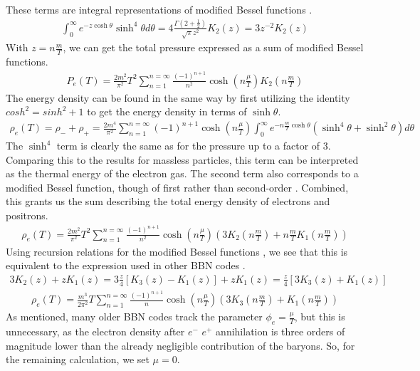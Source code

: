 These terms are integral representations of modified Bessel functions \cite[\href{https://dlmf.nist.gov/10.32.E8}{(10.32.8)}]{NIST:DLMF}.
\begin{align}
    \int_{0}^{\infty}e^{-z\cosh\theta}\sinh^4 \theta d\theta=4\frac{\Gamma(2+\frac{1}{2})}{\sqrt{\pi}z^2}K_2\left(z\right)=3z^{-2}K_2\left(z\right)
\end{align}
With $z=n\frac{m }{T}$, we can get the total pressure expressed as a sum of modified Bessel functions.
\begin{align}
    P_e(T)=\frac{2m^2}{\pi^2} T^2 \sum_{n=1}^{n=\infty} \frac{(-1)^{n+1}}{n^{2}} \cosh{\left(n\frac{\mu}{T}\right)}   K_2\left(n\frac{m }{T}\right)
    \label{eq:Pelectron}
\end{align}
The energy density can be found in the same way by first utilizing the identity $cosh^2=sinh^2+1$ to get the energy density in terms of $\sinh\theta$.
\begin{align}
    \rho_e(T)=\rho_-+\rho_+=\frac{2m^4}{\pi^2}\sum_{n=1}^{n=\infty} (-1)^{n+1} \cosh{\left(n\frac{\mu}{T}\right)}  \int_{0}^{\infty}e^{-n\frac{m }{T}\cosh\theta}\left(\sinh^4\theta +\sinh^2\theta\right) d\theta
\end{align}
The $\sinh^4$ term is clearly the same as for the pressure up to a factor of 3. Comparing this to the results for massless particles, this term can be interpreted as the thermal energy of the electron gas. The second term also corresponds to a modified Bessel function, though of first rather than second-order \cite[\href{https://dlmf.nist.gov/10.32.E8}{(10.32.8)}]{NIST:DLMF}. Combined, this grants us the sum describing the total energy density of electrons and positrons.
\begin{align}
    \rho_e(T)=\frac{2m^2}{\pi^2} T^2 \sum_{n=1}^{n=\infty} \frac{(-1)^{n+1}}{n^{2}} \cosh{\left(n\frac{\mu}{T}\right)}  \left( 3 K_2\left(n\frac{m }{T}\right) + n\frac{m }{T} K_1\left(n\frac{m }{T}\right) \right)
    \label{eq:rhoelectron}
\end{align}
Using recursion relations for the modified Bessel functions \cite[\href{https://dlmf.nist.gov/10.29.E1}{(10.29.1)}]{NIST:DLMF}, we see that this is equivalent to the expression used in other BBN codes \cite{Kawano}.
\begin{align}
3K_{2}(z)+z K_{1}(z)=3\frac{z}{4}[K_{3}(z)-K_{1}(z)]+z K_{1}(z)=\frac{z}{4}[3K_{3}(z)+K_{1}(z)]
\end{align}
\begin{align}
    \rho_e(T)=\frac{m^3}{2\pi^2} T \sum_{n=1}^{n=\infty} \frac{(-1)^{n+1}}{n} \cosh{\left(n\frac{\mu}{T}\right)}  \left( 3 K_3\left(n\frac{m }{T}\right) + K_1\left(n\frac{m }{T}\right) \right)
\end{align}
As mentioned, many older BBN codes track the parameter $\phi_e=\frac{\mu}{T}$, but this is unnecessary, as the electron density after $e^-$ $e^+$ annihilation is three orders of magnitude lower than the already negligible contribution of the baryons. So, for the remaining calculation, we set $\mu = 0$.

